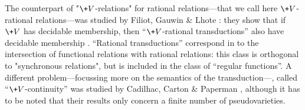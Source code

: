 The counterpart of "$\+V$-relations" for rational relations---that we call here $\+V$-rational relations---was studied by Filiot, Gauwin \& Lhote \cite{filiot_logical_2019}: they show that if
$\+V$ has decidable membership, then ``$\+V$-rational transductions'' also have decidable membership
\cite[Theorem 4.10, p.~26]{filiot_logical_2019}.
``Rational transductions'' correspond in  to the intersection of functional relations with rational relations: this class
is orthogonal to "synchronous relations",
but is included in the class of ``regular functions''.
A different problem---focussing more on the semantics of the transduction---, called ``$\+V$-continuity'' was studied by Cadilhac, Carton \& Paperman \cite[Theorem 1.3, p.~3]{cadilhac_continuity_2020}, although it has to be noted that their results only concern
a finite number of pseudovarieties.